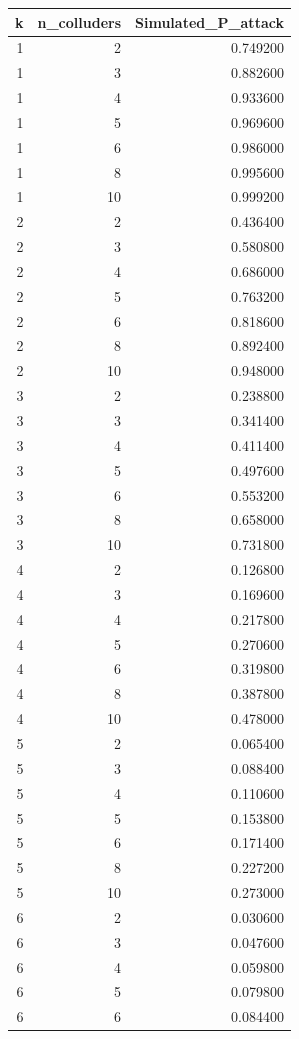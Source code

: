 \begin{tabular}{rrr}
\toprule
k & n_colluders & Simulated_P_attack \\
\midrule
1 & 2 & 0.749200 \\
1 & 3 & 0.882600 \\
1 & 4 & 0.933600 \\
1 & 5 & 0.969600 \\
1 & 6 & 0.986000 \\
1 & 8 & 0.995600 \\
1 & 10 & 0.999200 \\
2 & 2 & 0.436400 \\
2 & 3 & 0.580800 \\
2 & 4 & 0.686000 \\
2 & 5 & 0.763200 \\
2 & 6 & 0.818600 \\
2 & 8 & 0.892400 \\
2 & 10 & 0.948000 \\
3 & 2 & 0.238800 \\
3 & 3 & 0.341400 \\
3 & 4 & 0.411400 \\
3 & 5 & 0.497600 \\
3 & 6 & 0.553200 \\
3 & 8 & 0.658000 \\
3 & 10 & 0.731800 \\
4 & 2 & 0.126800 \\
4 & 3 & 0.169600 \\
4 & 4 & 0.217800 \\
4 & 5 & 0.270600 \\
4 & 6 & 0.319800 \\
4 & 8 & 0.387800 \\
4 & 10 & 0.478000 \\
5 & 2 & 0.065400 \\
5 & 3 & 0.088400 \\
5 & 4 & 0.110600 \\
5 & 5 & 0.153800 \\
5 & 6 & 0.171400 \\
5 & 8 & 0.227200 \\
5 & 10 & 0.273000 \\
6 & 2 & 0.030600 \\
6 & 3 & 0.047600 \\
6 & 4 & 0.059800 \\
6 & 5 & 0.079800 \\
6 & 6 & 0.084400 \\

\end{tabular}
